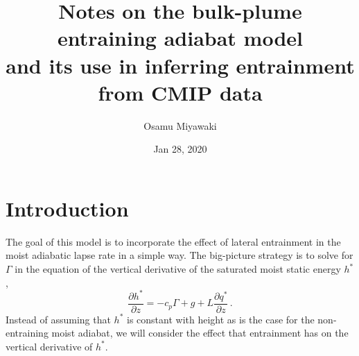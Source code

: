 \documentclass{article}
\title{Notes on the bulk-plume entraining adiabat model\\ and its use in inferring entrainment from CMIP data}
\author{Osamu Miyawaki}
\date{Jan 28, 2020}
\begin{document}
\maketitle
\section{Introduction}
The goal of this model is to incorporate the effect of lateral entrainment in the moist adiabatic lapse rate in a simple way. The big-picture strategy is to solve for $\Gamma$ in the equation of the vertical derivative of the saturated moist static energy $h^*$,
\begin{equation}
\frac{\partial h^*}{\partial z} = - c_p \Gamma + g + L \frac{\partial q^*}{\partial z} \, .
\end{equation}
Instead of assuming that $h^*$ is constant with height as is the case for the non-entraining moist adiabat, we will consider the effect that entrainment has on the vertical derivative of $h^*$.
\end{document}
